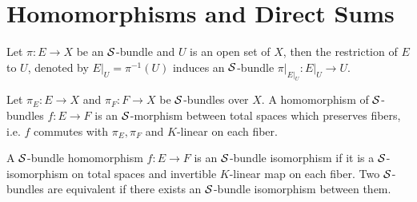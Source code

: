 \section{Homomorphisms and Direct Sums}

\begin{definition}
	Let $\pi: E \to X$ be an $\mathcal{S}$-bundle and $U$ is an open set of $X$, then the restriction of $E$ to $U$, denoted by $E\vert_U = \pi^{-1}(U)$ induces an $\mathcal{S}$-bundle $\pi \vert_{E\vert_U}: E\vert_U \to U$.
	\begin{center}
	\end{center}
\end{definition}

\begin{definition}
	Let $\pi_E: E \to X$ and $\pi_F: F \to X$ be $\mathcal{S}$-bundles over $X$. A homomorphism of $\mathcal{S}$-bundles $f: E \to F$ is an $\mathcal{S}$-morphism between total spaces which preserves fibers, i.e. $f$ commutes with $\pi_E, \pi_F$ and $K$-linear on each fiber.
	\begin{center}
	\end{center}
\end{definition}

\begin{definition}
	A $\mathcal{S}$-bundle homomorphism $f: E \to F$ is an $\mathcal{S}$-bundle isomorphism if it is a $\mathcal{S}$-isomorphism on total spaces and invertible $K$-linear map on each fiber. Two $\mathcal{S}$-bundles are equivalent if there exists an $\mathcal{S}$-bundle isomorphism between them.
\end{definition}

